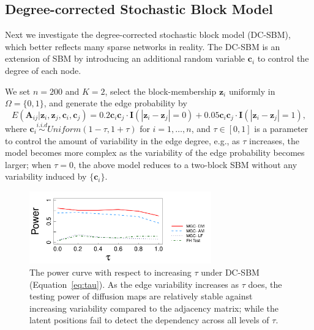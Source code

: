 \documentclass[12pt]{article}
\theoremstyle{definition}
\begin{document}
	
	\subsection{Degree-corrected Stochastic Block Model}
	Next we investigate the degree-corrected stochastic block model (DC-SBM), which better reflects many sparse networks in reality. The DC-SBM is an extension of SBM by introducing an additional random variable $\mathbf{c}_{i}$ to control the degree of each node. 
	
	We set $n=200$ and $K=2$, select the block-membership $\mathbf{z}_i$ uniformly in $\Omega=\{0,1\}$, and generate the edge probability by  
	\vspace*{-0.4cm}
	\begin{equation}
		E( \mathbf{A}_{ij} | \mathbf{z}_{i}, \mathbf{z}_{j},\mathbf{c}_{i},\mathbf{c}_{j} )  = 0.2 \mathbf{c}_{i} \mathbf{c}_{j} \cdot \mathbf{I}( |\mathbf{z}_{i} - \mathbf{z}_{j}| = 0 ) + 0.05 \mathbf{c}_{i} \mathbf{c}_{j} \cdot \mathbf{I}(|\mathbf{z}_{i} - \mathbf{z}_{j}| = 1),
		\label{eq:tau}
	\end{equation} 
	where $\mathbf{c}_{i} \overset{i.i.d}{\sim} Uniform(1 - \tau, 1 + \tau)$ for $i = 1, \ldots, n$, and $\tau \in [0, 1]$ is a parameter to control the amount of variability in the edge degree, e.g., as $\tau$ increases, the model becomes more complex as the variability of the edge probability becomes larger; when $\tau=0$, the above model reduces to a two-block SBM without any variability induced by $\{ \mathbf{c}_{i} \}$. 
	
	\begin{figure}[ht]
		\centering
		\includegraphics[width=0.7\textwidth]{../Figure/elbow3_dcSBM.pdf}
		\caption{The power curve with respect to increasing $\tau$ under DC-SBM (Equation~\ref{eq:tau}). As the edge variability increases as $\tau$ does, the testing power of diffusion maps are relatively stable against increasing variability compared to the adjacency matrix; while the latent positions fail to detect the dependency across all levels of $\tau$.}
		\label{fig:tau}
	\end{figure}
	
\end{document}
